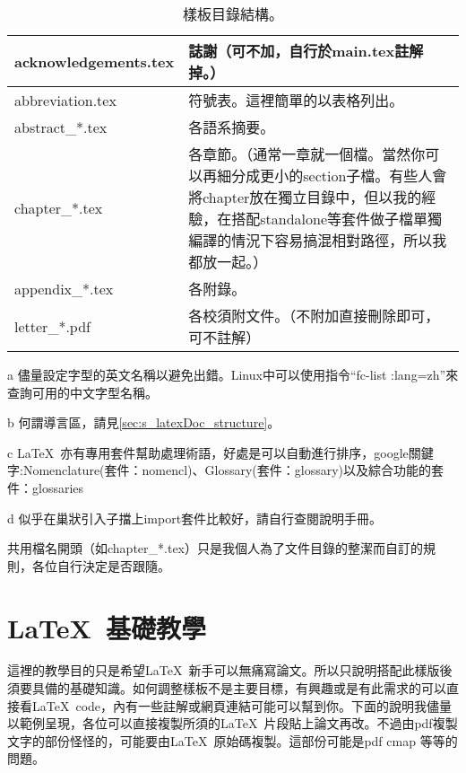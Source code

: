 \documentclass[class=NCU_thesis, crop=false, float=true]{standalone}
\begin{document}
\begin{table}
\begin{threeparttable}
\begin{tabularx}{\textwidth}{| l | X |}
        acknowledgements.tex & 誌謝（可不加，自行於main.tex註解掉。）  \\ \hline
        abbreviation.tex & 符號表。這裡簡單的以表格列出。\tnote{c}  \\ \hline
        abstract\_*.tex & 各語系摘要。  \\ \hline
        chapter\_*.tex & 各章節。（通常一章就一個檔。當然你可以再細分成更小的section子檔。\tnote{d}有些人會將chapter放在獨立目錄中，但以我的經驗，在搭配standalone等套件做子檔單獨編譯的情況下容易搞混相對路徑，所以我都放一起。）  \\ \hline
        appendix\_*.tex & 各附錄。  \\ \hline
        letter\_*.pdf & 各校須附文件。（不附加直接刪除即可，可不註解）  \\ \hline
    \end{tabularx}
    
    \caption{樣板目錄結構。}
    \label{tab:template_structure}
    
    \begin{tablenotes}
        \footnotesize
        \item[a]{儘量設定字型的英文名稱以避免出錯。Linux中可以使用指令``fc-list :lang=zh''來查詢可用的中文字型名稱。}
        \item[b] 何謂導言區，請見\cref{sec:s_latexDoc_structure}。
        \item[c] \LaTeX\ 亦有專用套件幫助處理術語，好處是可以自動進行排序，google關鍵字:Nomenclature(套件：nomencl)、Glossary(套件：glossary)以及綜合功能的套件：glossaries
        \item[d] 似乎在巢狀引入子擋上import套件比較好，請自行查閱說明手冊。
    \end{tablenotes}
    \end{threeparttable}
\end{table}
共用檔名開頭（如chapter\_*.tex）只是我個人為了文件目錄的整潔而自訂的規則，各位自行決定是否跟隨。

\chapter{\LaTeX\ 基礎教學}
\label{sec:c_basicLatex}
這裡的教學目的只是希望\LaTeX\ 新手可以無痛寫論文。所以只說明搭配此樣版後須要具備的基礎知識。如何調整樣板不是主要目標，有興趣或是有此需求的可以直接看\LaTeX\  code，內有一些註解或網頁連結可能可以幫到你。下面的說明我儘量以範例呈現，各位可以直接複製所須的\LaTeX\ 片段貼上論文再改。不過由pdf複製文字的部份怪怪的，可能要由\LaTeX\  原始碼複製。這部份可能是pdf cmap 等等的問題。
\end{document}
